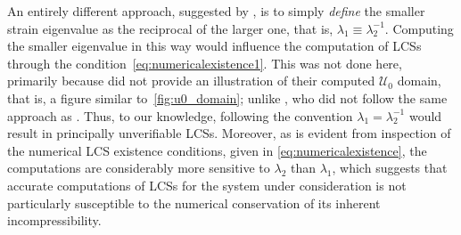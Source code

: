 An entirely different approach, suggested by \textcite{onu2015lcstool}, is to simply
\emph{define} the smaller strain eigenvalue as the reciprocal of the larger
one, that is, $\lambda_{1}\equiv\lambda_{2}^{-1}$. Computing the smaller
eigenvalue in this way would influence the computation of LCSs through
the condition~\eqref{eq:numericalexistence1}. This was not done here,
primarily because \citeauthor{onu2015lcstool} did not provide an illustration
of their computed $\mathcal{U}_{0}$ domain, that is, a figure similar
to~\cref{fig:u0_domain}; unlike \textcite{farazmand2012computing}, who
did not follow the same approach as \citeauthor{onu2015lcstool}. Thus,
to our knowledge, following the convention $\lambda_{1}=\lambda_{2}^{-1}$
would result in principally unverifiable LCSs. Moreover, as
is evident from inspection of the numerical LCS existence conditions, given in
\cref{eq:numericalexistence}, the computations are considerably more sensitive
to $\lambda_{2}$ than $\lambda_{1}$, which suggests that accurate computations
of LCSs for the system under consideration is not particularly susceptible to
the numerical conservation of its inherent incompressibility.

